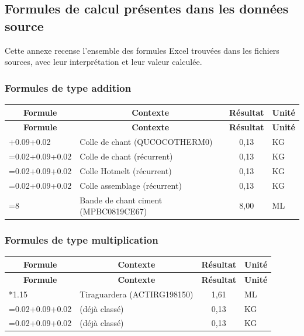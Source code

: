 \documentclass[12pt,a4paper]{article}
\begin{document}
\subsection{Formules de calcul présentes dans les données source}

Cette annexe recense l'ensemble des formules Excel trouvées dans les fichiers sources, avec leur interprétation et leur valeur calculée.

\subsubsection{Formules de type addition}

\begin{longtable}{|p{6cm}|p{5cm}|c|p{3cm}|}
\hline
\multicolumn{1}{|c|}{\textbf{Formule}} & \multicolumn{1}{c|}{\textbf{Contexte}} & \multicolumn{1}{c|}{\textbf{Résultat}} & \multicolumn{1}{c|}{\textbf{Unité}} \\
\hline
\endfirsthead
\hline
\multicolumn{1}{|c|}{\textbf{Formule}} & \multicolumn{1}{c|}{\textbf{Contexte}} & \multicolumn{1}{c|}{\textbf{Résultat}} & \multicolumn{1}{c|}{\textbf{Unité}} \\
\hline
\endhead
\hline
\endfoot
=0.02+0.09+0.02 & Colle de chant (QUCOCOTHERM0) & 0,13 & KG \\
=0.02+0.09+0.02 & Colle de chant (récurrent) & 0,13 & KG \\
=0.02+0.09+0.02 & Colle Hotmelt (récurrent) & 0,13 & KG \\
=0.02+0.09+0.02 & Colle assemblage (récurrent) & 0,13 & KG \\
=8 & Bande de chant ciment (MPBC0819CE67) & 8,00 & ML \\
\hline
\end{longtable}

\subsubsection{Formules de type multiplication}

\begin{longtable}{|p{6cm}|p{5cm}|c|p{3cm}|}
\hline
\multicolumn{1}{|c|}{\textbf{Formule}} & \multicolumn{1}{c|}{\textbf{Contexte}} & \multicolumn{1}{c|}{\textbf{Résultat}} & \multicolumn{1}{c|}{\textbf{Unité}} \\
\hline
\endfirsthead
\hline
\multicolumn{1}{|c|}{\textbf{Formule}} & \multicolumn{1}{c|}{\textbf{Contexte}} & \multicolumn{1}{c|}{\textbf{Résultat}} & \multicolumn{1}{c|}{\textbf{Unité}} \\
\hline
\endhead
\hline
\endfoot
=1.4*1.15 & Tiraguardera (ACTIRG198150) & 1,61 & ML \\
=0.02+0.09+0.02 & (déjà classé) & 0,13 & KG \\
=0.02+0.09+0.02 & (déjà classé) & 0,13 & KG \\
\hline
\end{longtable}
\end{document}
